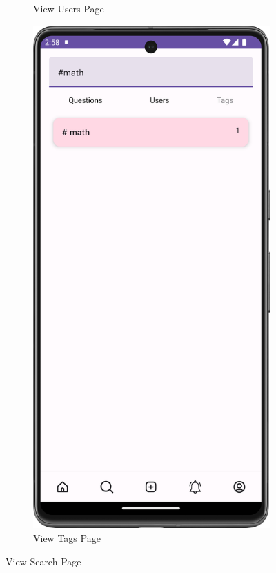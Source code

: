 \begin{figure}[H]
\begin{subfigure}[b]{0.3\textwidth}
    \caption{View Users Page}
    \label{fig:view_users_page}
  \end{subfigure}
  \hfill
  \begin{subfigure}[b]{0.3\textwidth}
    \includegraphics[width=\textwidth]{Figures/Product_Images/Questions_Answers/tags_page.png}
    \caption{View Tags Page}
    \label{fig:view_tags_page}
  \end{subfigure}
  \caption{View Search Page}
  \label{fig:view_search_page}
\end{figure}



